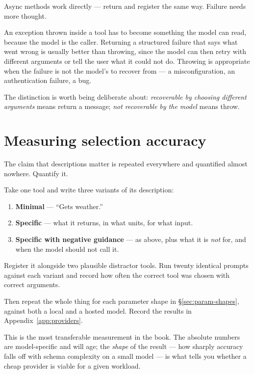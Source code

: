 Async methods work directly --- return  and register the same way.
Failure needs more thought.

An exception thrown inside a tool has to become something the model can read,
because the model is the caller. Returning a structured failure that says what
went wrong is usually better than throwing, since the model can then retry with
different arguments or tell the user what it could not do. Throwing is
appropriate when the failure is not the model's to recover from --- a
misconfiguration, an authentication failure, a bug.

The distinction is worth being deliberate about: \emph{recoverable by choosing
different arguments} means return a message; \emph{not recoverable by the model}
means throw.

\section{Measuring selection accuracy}
\label{sec:tool-accuracy}

The claim that descriptions matter is repeated everywhere and quantified almost
nowhere. Quantify it.

\begin{exercisebox}
Take one tool and write three variants of its description:

\begin{enumerate}[leftmargin=1.4em]
\item \textbf{Minimal} --- ``Gets weather.''
\item \textbf{Specific} --- what it returns, in what units, for what input.
\item \textbf{Specific with negative guidance} --- as above, plus what it is
      \emph{not} for, and when the model should not call it.
\end{enumerate}

Register it alongside two plausible distractor tools. Run twenty identical
prompts against each variant and record how often the correct tool was chosen
with correct arguments.

Then repeat the whole thing for each parameter shape in \S\ref{sec:param-shapes},
against both a local and a hosted model. Record the results in
Appendix~\ref{app:providers}.
\end{exercisebox}

This is the most transferable measurement in the book. The absolute numbers are
model-specific and will age; the \emph{shape} of the result --- how sharply
accuracy falls off with schema complexity on a small model --- is what tells you
whether a cheap provider is viable for a given workload.

